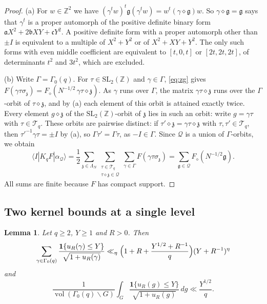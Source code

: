 \documentclass[11pt]{amsart}
\newtheorem{lemma}[theorem]{Lemma}
\theoremstyle{remark}
\theoremstyle{definition}
\numberwithin{equation}{section}
\newcommand{\Qc}{\mathcal{Q}}
\newcommand{\Tc}{\mathcal{T}}
\newcommand{\Z}{\mathbb{Z}}
\newcommand{\ga}{\mathfrak{a}}
\newcommand{\gb}{\mathfrak{b}}
\newcommand{\gc}{\mathfrak{c}}
\newcommand{\fg}{\mathfrak{g}}
\newcommand{\gz}{\mathfrak{z}}
\newcommand{\vol}{\operatorname{vol}}
\newcommand{\SL}{\mathrm{SL}}
\newcommand{\one}{\mathbf{1}}
\newcommand{\br}[1]{\langle #1\rangle}
\begin{document}
\begin{proof}
(a) For $w\in\Z^2$ we have $(\gamma^tw)^t\fg(\gamma^tw)=w^t(\gamma\diamond\fg)w$. So $\gamma\diamond\fg=\fg$ says that $\gamma^t$ is a proper automorph of the positive definite binary form $\ga X^2+2\gb XY+\gc Y^2$. A positive definite form with a proper automorph other than $\pm I$ is equivalent to a multiple of $X^2+Y^2$ or of $X^2+XY+Y^2$. The only such forms with even middle coefficient are equivalent to $[t,0,t]$ or $[2t,2t,2t]$, of determinants $t^2$ and $3t^2$, which are excluded.

(b) Write $\Gamma=\Gamma_0(q)$. For $\tau\in\SL_2(\Z)$ and $\gamma\in\Gamma$, \eqref{eq:zg} gives $F(\gamma\tau\sigma_\gz)=F_\diamond(N^{-1/2}\,\gamma\tau\diamond\gz)$. As $\gamma$ runs over $\Gamma$, the matrix $\gamma\tau\diamond\gz$ runs over the $\Gamma$-orbit of $\tau\diamond\gz$, and by (a) each element of this orbit is attained exactly twice. Every element $g\diamond\gz$ of the $\SL_2(\Z)$-orbit of $\gz$ lies in such an orbit: write $g=\gamma\tau$ with $\tau\in\Tc_q$. These orbits are pairwise distinct: if $\tau'\diamond\gz=\gamma\tau\diamond\gz$ with $\tau,\tau'\in\Tc_q$, then $\tau'^{-1}\gamma\tau=\pm I$ by (a), so $\Gamma\tau'=\Gamma\tau$, as $-I\in\Gamma$. Since $\Qc$ is a union of $\Gamma$-orbits, we obtain
\[
\br{I|K_qF|\alpha_\Qc}=\frac12\sum_{\gz\in\Lambda_N}\sum_{\substack{\tau\in\Tc_q\\ \tau\diamond\gz\in\Qc}}\sum_{\gamma\in\Gamma}F(\gamma\tau\sigma_\gz)=\sum_{\fg\in\Qc}F_\diamond(N^{-1/2}\fg).
\]
All sums are finite because $F$ has compact support.
\end{proof}

\subsection{Two kernel bounds at a single level}

\begin{lemma}\label{lem:K1}
Let $q\ge2$, $Y\ge1$ and $R>0$. Then
\[
\sum_{\gamma\in\Gamma_0(q)}\frac{\one\{u_R(\gamma)\le Y\}}{\sqrt{1+u_R(\gamma)}}\ll_\eta\Bigl(1+R+\frac{Y^{1/2}+R^{-1}}{q}\Bigr)(Y+R^{-1})^{\eta}
\]
and
\[
\frac{1}{\vol(\Gamma_0(q)\backslash G)}\int_G\frac{\one\{u_R(g)\le Y\}}{\sqrt{1+u_R(g)}}\,dg\ll\frac{Y^{1/2}}q .
\]
\end{lemma}
\end{document}
